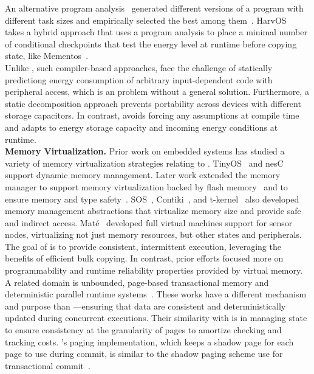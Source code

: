 %
An alternative program analysis~\cite{baghsorkhi_cgo_2018} generated different
versions of a program with different task sizes and empirically selected the
best among them~\cite{baghsorkhi_cgo_2018}.
%
HarvOS~\cite{mottola2017harvos} takes a hybrid approach that uses a program
analysis to place a minimal number of conditional checkpoints that test the
energy level at runtime before copying state, like Mementos~\cite{mementos}. \\
%
Unlike \sys, such compiler-based approaches, face the challenge of statically
predictiong energy consumption of arbitrary input-dependent code with
peripheral access, which is an problem without a general solution. Furthermore,
a static decomposition approach prevents portability across devices with
different storage capacitors. In contrast, \sys avoids forcing any assumptions
at compile time and adapts to energy storage capacity and incoming energy
conditions at runtime. \\
%
\textbf{Memory Virtualization.} Prior work on embedded systems has studied a
variety of memory virtualization strategies relating to \sys.
TinyOS~\cite{levis2005tinyos} and nesC~\cite{nesc} support dynamic memory
management. Later work extended the memory manager to support memory
virtualization backed by flash memory~\cite{sensornetvm} and to ensure memory
and type safety~\cite{tinyosmemorysafety}. SOS~\cite{sos},
Contiki~\cite{contiki}, and t-kernel~\cite{tkernel} also developed memory
management abstractions that virtualize memory size and provide safe and
indirect access. Mat\'e~\cite{mate} developed full virtual machines support for
sensor nodes, virtualizing not just memory resources, but other states and
peripherals. The goal of \sys is to provide consistent, intermittent execution,
leveraging the benefits of efficient bulk copying. In contrast, prior efforts
focused more on programmability and runtime reliability properties provided by
virtual memory. \\
%
A related domain is unbounded, page-based transactional memory and
deterministic parallel runtime systems~\cite{pagebasedtm,grace}.  These works
have a different mechanism and purpose than \sys---ensuring that data are
consistent and deterministically updated during concurrent executions.  Their
similarity with \sys is in managing state to ensure consistency at
the granularity of pages to amortize checking and tracking costs.
\sys's paging implementation, which keeps a shadow page for each page to use
during commit, is similar to the shadow paging scheme use for transactional
commit~\cite{pagebasedtm}.